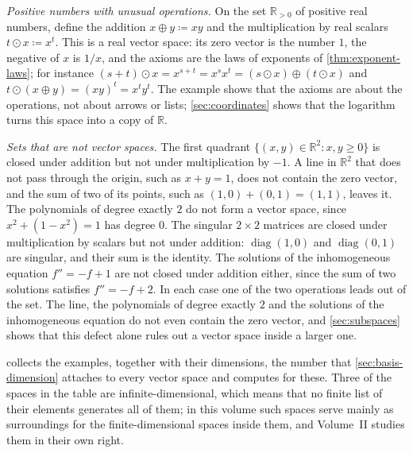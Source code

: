 \emph{Positive numbers with unusual operations.} On the set $\mathbb R_{>0}$ of positive real numbers, define the addition $x\oplus y\coloneqq xy$ and the multiplication by real scalars $t\odot x\coloneqq x^t$. This is a real vector space: its zero vector is the number $1$, the negative of $x$ is $1/x$, and the axioms are the laws of exponents of \cref{thm:exponent-laws}; for instance $(s+t)\odot x=x^{s+t}=x^sx^t=(s\odot x)\oplus(t\odot x)$ and $t\odot(x\oplus y)=(xy)^t=x^ty^t$. The example shows that the axioms are about the operations, not about arrows or lists; \cref{sec:coordinates} shows that the logarithm turns this space into a copy of $\mathbb R$.

\emph{Sets that are not vector spaces.} The first quadrant $\{(x,y)\in\mathbb R^2: x,y\ge0\}$ is closed under addition but not under multiplication by $-1$. A line in $\mathbb R^2$ that does not pass through the origin, such as $x+y=1$, does not contain the zero vector, and the sum of two of its points, such as $(1,0)+(0,1)=(1,1)$, leaves it. The polynomials of degree exactly $2$ do not form a vector space, since $x^2+(1-x^2)=1$ has degree $0$. The singular $2\times2$ matrices are closed under multiplication by scalars but not under addition: $\operatorname{diag}(1,0)$ and $\operatorname{diag}(0,1)$ are singular, and their sum is the identity. The solutions of the inhomogeneous equation $f''=-f+1$ are not closed under addition either, since the sum of two solutions satisfies $f''=-f+2$. In each case one of the two operations leads out of the set. The line, the polynomials of degree exactly $2$ and the solutions of the inhomogeneous equation do not even contain the zero vector, and \cref{sec:subspaces} shows that this defect alone rules out a vector space inside a larger one.

 collects the examples, together with their dimensions, the number that \cref{sec:basis-dimension} attaches to every vector space and computes for these. Three of the spaces in the table are infinite-dimensional, which means that no finite list of their elements generates all of them; in this volume such spaces serve mainly as surroundings for the finite-dimensional spaces inside them, and Volume~II studies them in their own right.

